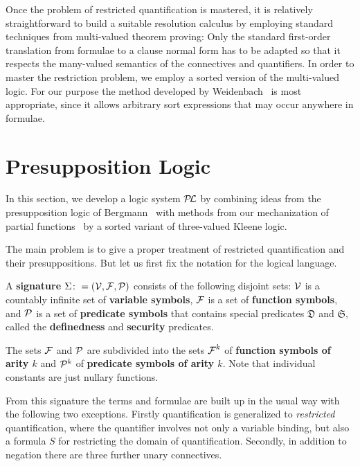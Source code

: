 \documentclass{\filespath jancl}
\def\Vars{{\cV}}                      %
\def\Funcs{{\mbox{$\cF$}}}
\def\cV{{\cal V}}\def\cW{{\cal W}}\def\cX{{\cal X}}
\newcommand{\Defined}{{\mathfrak D}}
\newcommand{\Secure}{{\mathfrak S}}
\def\presuppl{{\cal P\kern-.4ex L}}
\def\Preds{{\cal P}}
\begin{document}
Once the problem of restricted quantification is mastered, it is
relatively straightforward to build a suitable resolution calculus by
employing standard techniques from multi-valued theorem proving: Only
the standard first-order translation from formulae to a clause normal
form has to be adapted so that it respects the many-valued semantics
of the connectives and quantifiers. In order to master the restriction
problem, we employ a sorted version of the multi-valued logic.  For
our purpose the method developed by
Weidenbach~\cite{Weidenbach91,Weidenbach:cafols96} is most
appropriate, since it allows arbitrary sort expressions that may occur
anywhere in formulae.

\section{Presupposition Logic}
\label{sec:presuppl}

In this section, we develop a logic system $\presuppl$ by combining ideas from the
presupposition logic of Bergmann~\cite{Bergmann:patdl81} with methods from our
mechanization of partial functions~\cite{KeKo94} by a sorted variant of three-valued
Kleene logic.

The main problem is to give a proper treatment of restricted
quantification and their presuppositions. But let us first fix the notation
for the logical language. 

\begin{definition}[Signature]
  A {\bf signature} $\Sigma\colon=(\Vars,\Funcs,\Preds)$ consists of the
  following disjoint sets: $\Vars$ is a countably infinite set of {\bf
    variable symbols}, $\Funcs$ is a set of {\bf function symbols}, and
  $\Preds$ is a set of {\bf predicate symbols} that contains special predicates
  $\Defined$ and $\Secure$, called the {\bf definedness} and {\bf security}
  predicates.
  
  The sets $\Funcs$ and $\Preds$ are subdivided into the sets $\Funcs^k$ of
  {\bf function symbols of arity $k$} and $\Preds^k$ of {\bf predicate symbols
    of arity $k$}. Note that individual constants are just nullary functions.
\end{definition}

{}From this signature the terms and formulae are built up in the
usual way with the following two exceptions. Firstly quantification is
generalized to {\em restricted\/} quantification, where the quantifier involves
not only a variable binding, but also a formula $S$ for restricting the domain
of quantification. Secondly, in addition to negation there are three further unary connectives.
\end{document}
